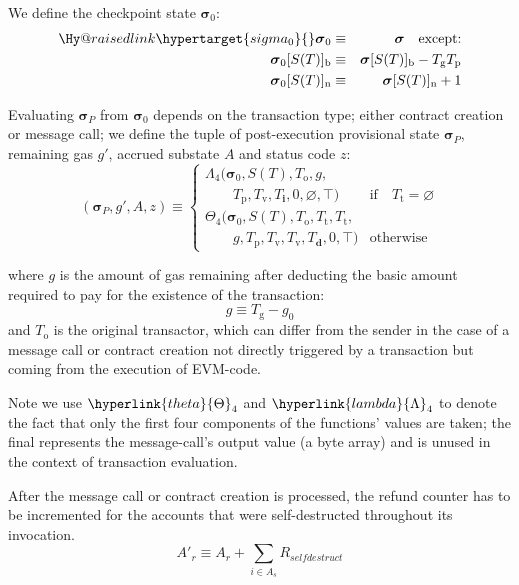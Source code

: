 \documentclass[9pt,oneside]{amsart}
\makeatletter
\newcommand{\linkdest}[1]{\Hy@raisedlink{\hypertarget{#1}{}}}
\makeatother
\begin{document}
\begin{multicols}{2}
We define the checkpoint state $\boldsymbol{\sigma}_0$:
\begin{eqnarray}
\linkdest{sigma_0}{}\boldsymbol{\sigma}_0 & \equiv & \boldsymbol{\sigma} \quad \text{except:} \\
\boldsymbol{\sigma}_0[S(T)]_{\mathrm{b}} & \equiv & \boldsymbol{\sigma}[S(T)]_{\mathrm{b}} - T_{\mathrm{g}} T_{\mathrm{p}} \\
\boldsymbol{\sigma}_0[S(T)]_{\mathrm{n}} & \equiv & \boldsymbol{\sigma}[S(T)]_{\mathrm{n}} + 1
\end{eqnarray}

Evaluating $\boldsymbol{\sigma}_{P}$ from $\boldsymbol{\sigma}_0$ depends on the transaction type; either contract creation or message call; we define the tuple of post-execution provisional state $\boldsymbol{\sigma}_{P}$, remaining gas $g'$, accrued substate $A$ and status code $z$:
\begin{equation}
(\boldsymbol{\sigma}_{P}, g', A, z) \equiv \begin{cases}
\Lambda_{4}(\boldsymbol{\sigma}_0, S(T), T_{\mathrm{o}}, g, &\\ \quad\quad T_{\mathrm{p}}, T_{\mathrm{v}}, T_{\mathbf{i}}, 0, \varnothing, \top) & \text{if} \quad T_{\mathrm{t}} = \varnothing \\
\Theta_{4}(\boldsymbol{\sigma}_0, S(T), T_{\mathrm{o}}, T_{\mathrm{t}}, T_{\mathrm{t}}, &\\ \quad\quad g, T_{\mathrm{p}}, T_{\mathrm{v}}, T_{\mathrm{v}}, T_{\mathbf{d}}, 0, \top) & \text{otherwise}
\end{cases}
\end{equation}

where $g$ is the amount of gas remaining after deducting the basic amount required to pay for the existence of the transaction:
\begin{equation}
g \equiv T_{\mathrm{g}} - g_0
\end{equation}
and $T_{\mathrm{o}}$ is the original transactor, which can differ from the sender in the case of a message call or contract creation not directly triggered by a transaction but coming from the execution of EVM-code.

Note we use $\hyperlink{theta}{\Theta}_{4}$ and $\hyperlink{lambda}{\Lambda}_{4}$ to denote the fact that only the first four components of the functions' values are taken; the final represents the message-call's output value (a byte array) and is unused in the context of transaction evaluation.

After the message call or contract creation is processed, the refund counter has to be incremented for the accounts that were self-destructed throughout its invocation.
\begin{equation}
	A'_{r} \equiv A_{r} + \sum_{i \in A_{s}} R_{selfdestruct}
\end{equation}


\end{multicols}
\end{document}
